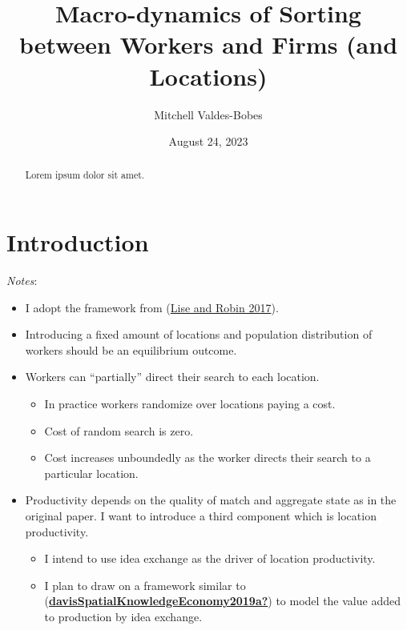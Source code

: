\documentclass[
  letterpaper,
  DIV=11,
  numbers=noendperiod]{scrreprt}
\title{Macro-dynamics of Sorting between Workers and Firms (and
Locations)}
\author{Mitchell Valdes-Bobes}
\date{August 24, 2023}
\providecommand{\tightlist}{%
  \setlength{\itemsep}{0pt}\setlength{\parskip}{0pt}}\usepackage{longtable,booktabs,array}
\renewcommand*\contentsname{Table of contents}
\newcommand\contentsname{Table of contents}
\begin{document}
\maketitle
\begin{abstract}
Lorem ipsum dolor sit amet.
\end{abstract}
\ifdefined\Shaded\renewenvironment{Shaded}{\begin{tcolorbox}[borderline west={3pt}{0pt}{shadecolor}, interior hidden, enhanced, breakable, frame hidden, sharp corners, boxrule=0pt]}{\end{tcolorbox}}\fi

\renewcommand*\contentsname{Table of contents}
{
\hypersetup{linkcolor=}
\setcounter{tocdepth}{2}
\tableofcontents
}

\hypertarget{introduction}{%
\chapter{Introduction}\label{introduction}}

\emph{Notes}:

\begin{itemize}
\tightlist
\item
  I adopt the framework from
  (\protect\hyperlink{ref-liseMacrodynamicsSortingWorkers2017}{Lise and
  Robin 2017}).
\item
  Introducing a fixed amount of locations and population distribution of
  workers should be an equilibrium outcome.
\item
  Workers can ``partially'' direct their search to each location.

  \begin{itemize}
  \tightlist
  \item
    In practice workers randomize over locations paying a cost.
  \item
    Cost of random search is zero.
  \item
    Cost increases unboundedly as the worker directs their search to a
    particular location.
  \end{itemize}
\item
  Productivity depends on the quality of match and aggregate state as in
  the original paper. I want to introduce a third component which is
  location productivity.

  \begin{itemize}
  \tightlist
  \item
    I intend to use idea exchange as the driver of location
    productivity.
  \item
    I plan to draw on a framework similar to
    (\protect\hyperlink{ref-davisSpatialKnowledgeEconomy2019a}{\textbf{davisSpatialKnowledgeEconomy2019a?}})
    to model the value added to production by idea exchange.
  \end{itemize}
\end{itemize}
\end{document}
